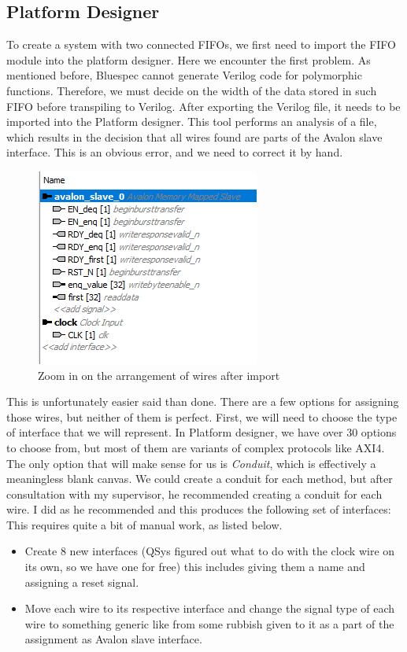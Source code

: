 \documentclass[12pt]{report}
\begin{document}
\subsection{Platform Designer} 
To create a system with two connected FIFOs, we first need to import the FIFO module into the platform designer. 
Here we encounter the first problem. 
As mentioned before, Bluespec cannot generate Verilog code for polymorphic functions. 
Therefore, we must decide on the width of the data stored in such FIFO before transpiling to Verilog. 
After exporting the Verilog file, it needs to be imported into the Platform designer. 
This tool performs an analysis of a file, which results in the decision that all wires found are parts of the Avalon slave interface. 
This is an obvious error, and we need to correct it by hand. 
\begin{figure}[H] 
    \centering 
    \includegraphics[width=0.5\columnwidth]{images/Example1BeforeOranization.png} \caption{Zoom in on the arrangement of wires after import} 
\end{figure} 
This is unfortunately easier said than done. 
There are a few options for assigning those wires, but neither of them is perfect.
First, we will need to choose the type of interface that we will represent. In Platform designer, we have over 30 options to choose from, but most of them are variants of complex protocols like AXI4. 
The only option that will make sense for us is \emph{Conduit}, which is effectively a meaningless blank canvas. We could create a conduit for each method, but after consultation with my supervisor, he recommended creating a conduit for each wire. 
I did as he recommended and this produces the following set of interfaces: This requires quite a bit of manual work, as listed below. 
\begin{itemize} 
    \item Create 8 new interfaces (QSys figured out what to do with the clock wire on its own, so we have one for free) this includes giving them a name and assigning a reset signal. 
    \item Move each wire to its respective interface and change the signal type of each wire to something generic like  from some rubbish given to it as a part of the assignment as Avalon slave interface.
\end{itemize} 
\end{document}
